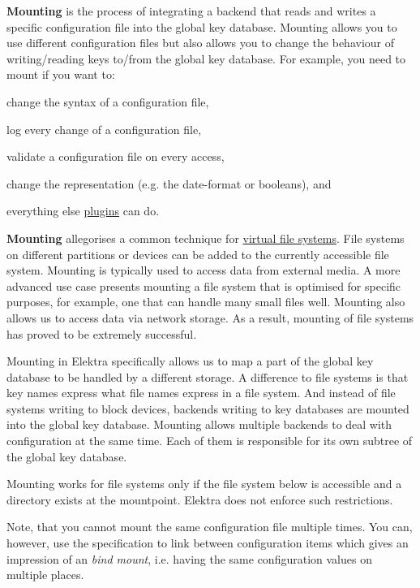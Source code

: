 {\bfseries Mounting} is the process of integrating a backend that reads and writes a specific configuration file into the global key database. Mounting allows you to use different configuration files but also allows you to change the behaviour of writing/reading keys to/from the global key database. For example, you need to mount if you want to\+:


\begin{DoxyItemize}
\item change the syntax of a configuration file,
\item log every change of a configuration file,
\item validate a configuration file on every access,
\item change the representation (e.\+g. the date-\/format or booleans), and
\item everything else \hyperlink{md_src_plugins_README_src_plugins_README_md}{plugins} can do.
\end{DoxyItemize}

{\bfseries Mounting} allegorises a common technique for \hyperlink{doc_BIGPICTURE_md}{virtual file systems}. File systems on different partitions or devices can be added to the currently accessible file system. Mounting is typically used to access data from external media. A more advanced use case presents mounting a file system that is optimised for specific purposes, for example, one that can handle many small files well. Mounting also allows us to access data via network storage. As a result, mounting of file systems has proved to be extremely successful.

Mounting in Elektra specifically allows us to map a part of the global key database to be handled by a different storage. A difference to file systems is that key names express what file names express in a file system. And instead of file systems writing to block devices, backends writing to key databases are mounted into the global key database. Mounting allows multiple backends to deal with configuration at the same time. Each of them is responsible for its own subtree of the global key database.

Mounting works for file systems only if the file system below is accessible and a directory exists at the mountpoint. Elektra does not enforce such restrictions.

Note, that you cannot mount the same configuration file multiple times. You can, however, use the specification to link between configuration items which gives an impression of an {\itshape bind mount}, i.\+e. having the same configuration values on multiple places.


